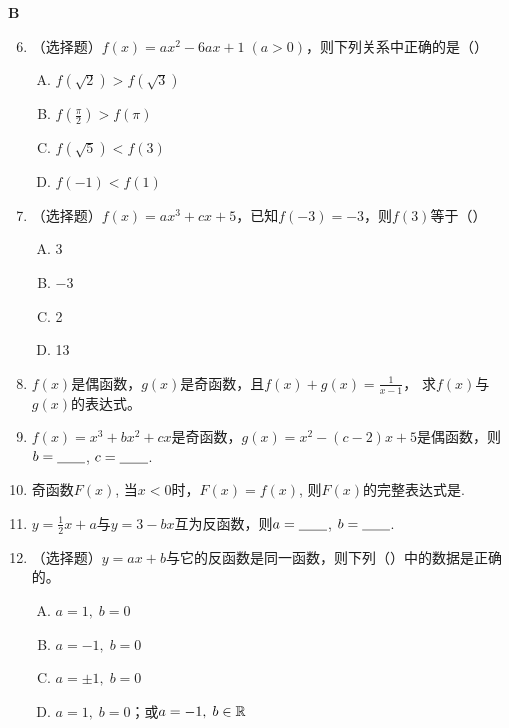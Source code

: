 \begin{center}
    \bfseries B
\end{center}

\begin{enumerate}\setcounter{enumi}{5}
    \item （选择题）$f(x)=ax^2-6ax+1\; (a>0)$，则下列关系中正确的是（\quad）
\begin{multicols}{2}
    \begin{enumerate}[(A)]
        \item $f(\sqrt{2})>f(\sqrt{3})$
        \item $f\left(\frac{\pi}{2}\right)>f(\pi)$
        \item $f(\sqrt{5})<f(3)$
        \item $f(-1)<f(1)$
    \end{enumerate}
    \end{multicols}
\item （选择题）$f(x)=ax^3+cx+5$，已知$f(-3)=-3$，则$f(3)$等于（\quad）
\begin{multicols}{4}
    \begin{enumerate}[(A)]
        \item 3
        \item $-3$
        \item 2
        \item 13
    \end{enumerate}
    \end{multicols}
\item $f(x)$是偶函数，$g(x)$是奇函数，且$f(x)+g(x)=\frac1{x-1}$，
求$f(x)$与$g(x)$的表达式。

\item $f(x)=x^{3}+bx^{2}+cx$是奇函数，$g(x)=x^{2}-(c-2)x+5$是偶函数，则$b=\underline{\qquad}$, $c=\underline{\qquad}$.

\item 奇函数$F(x)$, 当$x<0$时，$F(x)=f(x)$, 则$F(x)$的完整表达式是\blank.

\item $y= \frac{1}{2} x+ a$与$y=3-bx$互为反函数，则$a=\underline{\qquad}$, $b=\underline{\qquad}$.
    
\item （选择题）$y=ax+b$与它的反函数是同一函数，则下列（\quad ）中的数据是正确的。
\begin{multicols}{2}
    \begin{enumerate}[(A)]
        \item $a=1,\; b=0$
        \item $a=-1,\; b=0$
        \item $a=\pm 1,\; b=0$
        \item $a=1,\; b=0$；或$a=-1,\; b\in\mathbb{R}$
    \end{enumerate}
    \end{multicols}


\end{enumerate}
